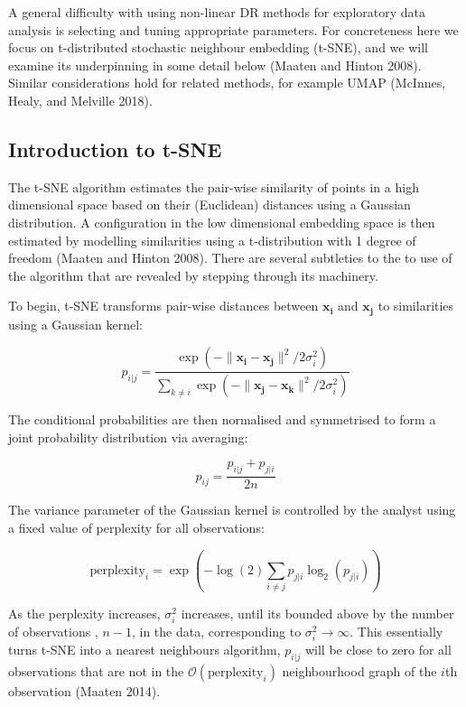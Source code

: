 \documentclass[article,notitle]{jdssv}
\begin{document}
A general difficulty with using
non-linear DR methods for exploratory data analysis is selecting and tuning
appropriate parameters. For concreteness here we focus on t-distributed
stochastic neighbour embedding (t-SNE), and we will examine
its underpinning in some detail below (Maaten and Hinton 2008). Similar considerations hold for related
methods, for example UMAP (McInnes, Healy, and Melville 2018).

\hypertarget{introduction-to-t-sne}{%
\subsection{Introduction to t-SNE}\label{introduction-to-t-sne}}

The t-SNE algorithm estimates the pair-wise similarity of points in a high
dimensional space based on their (Euclidean) distances using a Gaussian
distribution. A configuration in the low dimensional embedding space is then
estimated by modelling similarities using a t-distribution with 1 degree of
freedom (Maaten and Hinton 2008). There are several subtleties
to the to use of the algorithm that are revealed by stepping through its
machinery.

To begin, t-SNE transforms pair-wise distances between \(\mathbf{x_i}\) and
\(\mathbf{x_j}\) to similarities using a Gaussian kernel:

\[ 
p_{i|j} = \frac{\exp(-\lVert \mathbf{x_i - x_j} \rVert ^ 2 /
2\sigma_i^2)}{\sum_{k \ne i}\exp(-\lVert \mathbf{x_j - x_k} \rVert ^ 2 /
2\sigma_i^2)} 
\]

The conditional probabilities are then normalised and symmetrised to form a
joint probability distribution via averaging:

\[ p_{ij} = \frac{p_{i|j} + p_{j|i}}{2n} \]

The variance parameter of the Gaussian kernel is controlled by the analyst
using a fixed value of perplexity for all observations:

\[ \text{perplexity}_i = \exp(-\log(2) \sum_{i \ne j}p_{j|i}\log_2(p_{j|i})) \]

As the perplexity increases, \(\sigma^2_{i}\) increases, until its bounded above
by the number of observations , \(n-1\), in the data, corresponding to
\(\sigma^2_{i} \rightarrow \infty\). This essentially turns t-SNE into a
nearest neighbours algorithm, \(p_{i|j}\) will be close to zero for all
observations that are not in the \(\mathcal{O}(\text{perplexity}_i)\)
neighbourhood graph of the \(i\)th observation (Maaten 2014).
\end{document}
